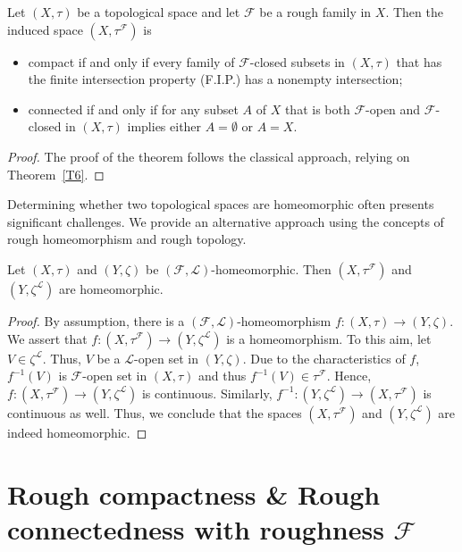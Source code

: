 \documentclass[11pt]{amsart}
\begin{document}
\begin{theorem}\label{Th5.3}
 Let $(X,\tau)$ be a topological space and let $\mathscr{F}$ be a rough family in $X$. Then the induced space $(X,\tau^\mathscr{F})$ is 
 \begin{itemize}
    \item[(i)] compact if and only if every family of $\mathscr{F}$-closed subsets in $(X,\tau)$ that has the finite intersection property (F.I.P.) has a nonempty intersection;

    \item[(ii)] connected if and only if for any subset $A$ of $X$ that is both $\mathscr{F}$-open and $\mathscr{F}$-closed in $(X,\tau)$ implies either $A=\emptyset$ or $A=X$.
\end{itemize}
\end{theorem}

\begin{proof}
     The proof of the theorem follows the classical approach, relying on Theorem~\ref{T6}.
\end{proof}


Determining whether two topological spaces are homeomorphic often presents significant challenges. We provide an alternative approach using the concepts of rough homeomorphism and rough topology.

\begin{theorem}
    Let $(X,\tau)$ and $(Y,\zeta)$ be $(\mathscr{F},\mathscr{L})$-homeomorphic. Then $(X,\tau^\mathscr{F})$ and $(Y,\zeta^\mathscr{L})$ are homeomorphic.
\end{theorem}

\begin{proof}
    By assumption, there is a $(\mathscr{F},\mathscr{L})$-homeomorphism $f: (X,\tau)\to (Y,\zeta)$. We assert that $f: (X,\tau^\mathscr{F})\to (Y,\zeta^\mathscr{L})$ is a homeomorphism. To this aim, let $V\in \zeta^\mathscr{L}$. Thus, $V$ be a $\mathscr{L}$-open set in $(Y,\zeta)$. Due to the characteristics of $f$, $f^{-1}(V)$ is $\mathscr{F}$-open set in $(X,\tau)$ and thus $f^{-1}(V)\in \tau^\mathscr{F}$. Hence, $f: (X,\tau^\mathscr{F})\to (Y,\zeta^\mathscr{L})$ is continuous. Similarly, $f^{-1}: (Y,\zeta^\mathscr{L})\to (X,\tau^\mathscr{F})$ is continuous as well. Thus, we conclude that the spaces $(X,\tau^\mathscr{F})$ and $(Y,\zeta^\mathscr{L})$ are indeed homeomorphic.
\end{proof}

\section{Rough compactness \& Rough connectedness with roughness $\mathscr{F}$}\label{Sec5}
\end{document}
